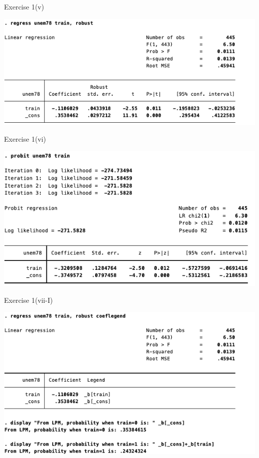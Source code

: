 \documentclass[
  10pt,
  ignorenonframetext,
]{beamer}
\begin{document}
\begin{frame}{Exercise 1(v)}
\protect\hypertarget{LMPsimplereg}{}
\begin{center}\includegraphics[width=0.9\linewidth]{pictures/LMPsimplereg} \end{center}
\end{frame}

\begin{frame}{Exercise 1(vi)}
\protect\hypertarget{PROBITsimplereg}{}
\begin{center}\includegraphics[width=0.9\linewidth]{pictures/PROBITsimplereg} \end{center}
\end{frame}

\begin{frame}{Exercise 1(vii-I)}
\protect\hypertarget{LMPsimplereg_predict}{}
\begin{center}\includegraphics[width=0.9\linewidth]{pictures/LMPsimplereg_predict} \end{center}
\end{frame}
\end{document}
